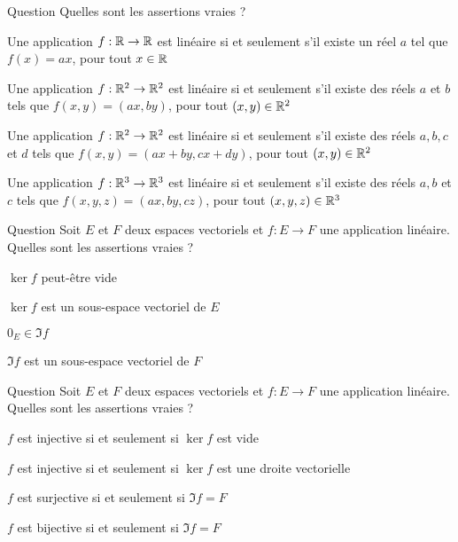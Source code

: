 \begin{multi}[multiple,feedback=
{Une application \(f:\Rr^n \to \Rr^m\) est linéaire si et seulement s'il existe des réels \(a_{i,j}, 1\le i \le m, 1\le j \le n\),  tels que :\\ \(f(x_1,x_2,\dots,x_n)=(a_{1,1}x_1+a_{1,2}x_2 + \dots + a_{1,n}x_n,\dots, a_{m,1}x_1+a_{m,2}x_2 + \dots + a_{m,n}x_n)\), pour tout \((x_1,x_2,\dots,x_n) \in \Rr^n\).
}]{Question}
Quelles sont les assertions vraies ?

    \item* Une application \(f:\mathbb{R} \to \mathbb{R}\) est linéaire si et seulement s'il existe un réel \(a\) tel que \(f(x)=ax\), pour tout \(x\in \mathbb{R}\)
    \item Une application \(f:\mathbb{R}^2 \to \mathbb{R}^2\) est linéaire si et seulement s'il existe des réels \(a\) et \(b\) tels que \(f(x,y)=(ax,by)\), pour tout \((x,y) \in \mathbb{R}^2\)
    \item* Une application \(f:\mathbb{R}^2 \to \mathbb{R}^2\) est linéaire si et seulement s'il existe des réels \(a,b,c\) et \(d\) tels que \(f(x,y)=(ax+by,cx+dy)\), pour tout \((x,y)\in \mathbb{R}^2\)
    \item Une application \(f:\mathbb{R}^3 \to \mathbb{R}^3\) est linéaire si et seulement s'il existe des réels \(a,b\) et \(c\) tels que \(f(x,y,z)=(ax,by,cz)\), pour tout \((x,y,z)\in \mathbb{R}^3\)
\end{multi}


\begin{multi}[multiple,feedback=
{\(\ker f\) est un sous-espace vectoriel de \(E\), il contient au moins \(0_E\).
\vskip0mm
\(\Im f \) est un sous-espace vectoriel de \(F\), il contient au moins \(0_F\), puisque \(f(0_E)=0_F\).
}]{Question}
Soit \(E\) et \(F\) deux espaces vectoriels et \(f:E\to F\) une application linéaire. Quelles sont les assertions vraies ?

    \item \(\ker f\) peut-être vide
    \item* \(\ker f\) est un sous-espace vectoriel de \(E\)
    \item \(0_E \in \Im f\)
    \item* \(\Im f\) est un sous-espace vectoriel de \(F\)
\end{multi}


\begin{multi}[multiple,feedback=
{\(f\) est injective si et seulement si \(\ker f=\{0_E\}\).
\vskip0mm
\(f\) est surjective si et seulement si \(\Im f=F\).
\vskip0mm
\(f\) est bijective si et seulement si \(\ker f=\{0_E\}\) et \(\Im f=F\).
}]{Question}
Soit \(E\) et \(F\) deux espaces vectoriels et \(f:E\to F\) une application linéaire.
Quelles sont les assertions vraies ?

    \item \(f\) est injective si et seulement si \(\ker f\) est vide
    \item \(f\) est injective si et seulement si \(\ker f\) est une droite vectorielle
    \item* \(f\) est surjective si et seulement si \(\Im f=F\)
    \item \(f\) est bijective si et seulement si \(\Im f=F\)
\end{multi}


